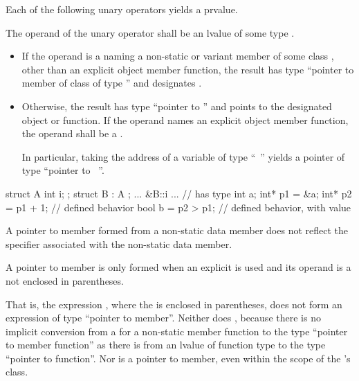 \pnum
Each of the following unary operators yields a prvalue.

\pnum
{}%
%
The operand of the unary \tcode{\&} operator
shall be an lvalue of some type .
\begin{itemize}
\item
If the operand is a  naming a non-static or variant member 
of some class , other than an explicit object member function, the result has type ``pointer to member
of class  of type '' and designates .
\item
Otherwise, the result has type ``pointer to '' and points to
the designated object or function.
If the operand names an explicit object member function,
the operand shall be a .
\begin{note}
In particular, taking the address of a variable of type ``\cv{}~''
yields a pointer of type ``pointer to \cv{}~''.
\end{note}
\end{itemize}
\begin{example}
\begin{codeblock}
struct A { int i; };
struct B : A { };
... &B::i ...       // has type 
int a;
int* p1 = &a;
int* p2 = p1 + 1;   // defined behavior
bool b = p2 > p1;   // defined behavior, with value 
\end{codeblock}
\end{example}
\begin{note}
A pointer to member formed from a  non-static data
member does not reflect the  specifier
associated with the non-static data member.
\end{note}

\pnum
A pointer to member is only formed when an explicit \tcode{\&} is used
and its operand is a  not enclosed in
parentheses.
\begin{note}
That is, the expression , where the
 is enclosed in parentheses, does not form an
expression of type ``pointer to member''. Neither does
, because there is no implicit conversion from a
 for a non-static member function to the type
``pointer to member function'' as there is from an lvalue of function
type to the type ``pointer to function''. Nor is
 a pointer to member, even within the scope of
the 's class.
\end{note}

